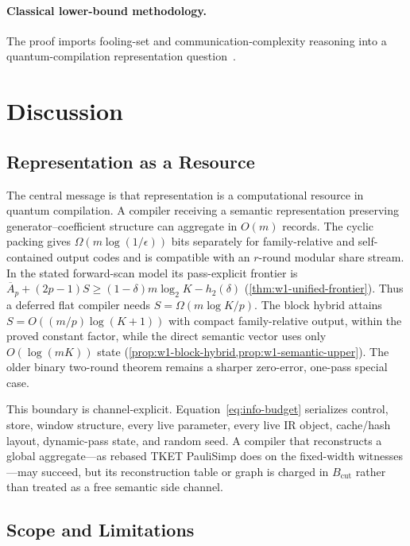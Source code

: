 \documentclass[aps,prx,reprint,floatfix,superscriptaddress]{revtex4-2}
\begin{document}
\paragraph{Classical lower-bound methodology.}
The proof imports fooling-set and communication-complexity reasoning into
a quantum-compilation representation
question~\cite{sipser2012introduction,kushilevitz1997communication,alur2010streaming}.


\section{Discussion}
\label{sec:discussion}

\subsection{Representation as a Resource}

The central message is that representation is a computational resource in
quantum compilation. A compiler receiving a semantic representation
preserving generator--coefficient structure can aggregate in $O(m)$
records.  The cyclic packing gives
$\Omega(m\log(1/\epsilon))$ bits separately for family-relative and
self-contained output codes and is compatible with an $r$-round modular
share stream.  In the stated forward-scan model its pass-explicit frontier is
$\overline A_p+(2p-1)S\geq
(1-\delta)m\log_2K-h_2(\delta)$
(\cref{thm:w1-unified-frontier}).  Thus a deferred flat compiler needs
$S=\Omega(m\log K/p)$.  The block hybrid attains
$S=O((m/p)\log(K+1))$ with compact family-relative output, within the
proved constant factor, while the direct semantic vector uses only
$O(\log(mK))$ state
(\cref{prop:w1-block-hybrid,prop:w1-semantic-upper}).  The older binary
two-round theorem remains a sharper zero-error, one-pass special case.

This boundary is channel-explicit.  Equation~\eqref{eq:info-budget}
serializes control, store, window structure, every live parameter, every
live IR object, cache/hash layout, dynamic-pass state, and random seed.  A
compiler that reconstructs a global aggregate---as
rebased TKET PauliSimp does on the fixed-width witnesses---may succeed, but
its reconstruction table or graph is charged in $B_{\mathrm{cut}}$ rather
than treated as a free semantic side channel.

\subsection{Scope and Limitations}
\end{document}
